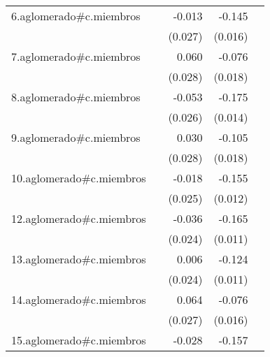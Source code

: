 {\begin{longtable}{l*{4}{D{.}{.}{-1}}}
\addlinespace
6.aglomerado#c.miembros&                     &      -0.013         &      -0.145\sym{***}&                     \\
            &                     &     (0.027)         &     (0.016)         &                     \\
\addlinespace
7.aglomerado#c.miembros&                     &       0.060\sym{*}  &      -0.076\sym{***}&                     \\
            &                     &     (0.028)         &     (0.018)         &                     \\
\addlinespace
8.aglomerado#c.miembros&                     &      -0.053\sym{*}  &      -0.175\sym{***}&                     \\
            &                     &     (0.026)         &     (0.014)         &                     \\
\addlinespace
9.aglomerado#c.miembros&                     &       0.030         &      -0.105\sym{***}&                     \\
            &                     &     (0.028)         &     (0.018)         &                     \\
\addlinespace
10.aglomerado#c.miembros&                     &      -0.018         &      -0.155\sym{***}&                     \\
            &                     &     (0.025)         &     (0.012)         &                     \\
\addlinespace
12.aglomerado#c.miembros&                     &      -0.036         &      -0.165\sym{***}&                     \\
            &                     &     (0.024)         &     (0.011)         &                     \\
\addlinespace
13.aglomerado#c.miembros&                     &       0.006         &      -0.124\sym{***}&                     \\
            &                     &     (0.024)         &     (0.011)         &                     \\
\addlinespace
14.aglomerado#c.miembros&                     &       0.064\sym{*}  &      -0.076\sym{***}&                     \\
            &                     &     (0.027)         &     (0.016)         &                     \\
\addlinespace
15.aglomerado#c.miembros&                     &      -0.028         &      -0.157\sym{***}&                     \\

\end{longtable}}
